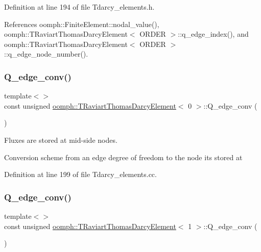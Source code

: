 Definition at line 194 of file Tdarcy\+\_\+elements.\+h.



References oomph\+::\+Finite\+Element\+::nodal\+\_\+value(), oomph\+::\+T\+Raviart\+Thomas\+Darcy\+Element$<$ O\+R\+D\+E\+R $>$\+::q\+\_\+edge\+\_\+index(), and oomph\+::\+T\+Raviart\+Thomas\+Darcy\+Element$<$ O\+R\+D\+E\+R $>$\+::q\+\_\+edge\+\_\+node\+\_\+number().

\mbox{\label{classoomph_1_1TRaviartThomasDarcyElement_a6c9a1ccd1e7121919df4ceb07c092c88}} 
\subsubsection{\texorpdfstring{Q\+\_\+edge\+\_\+conv()}{Q\_edge\_conv()}\hspace{0.1cm}{\footnotesize\ttfamily [1/2]}}
{\footnotesize\ttfamily template$<$$>$ \\
const unsigned \hyperlink{classoomph_1_1TRaviartThomasDarcyElement}{oomph\+::\+T\+Raviart\+Thomas\+Darcy\+Element}$<$ 0 $>$\+::Q\+\_\+edge\+\_\+conv (\begin{DoxyParamCaption}{ }\end{DoxyParamCaption})\hspace{0.3cm}{\ttfamily [private]}}



Fluxes are stored at mid-\/side nodes. 

Conversion scheme from an edge degree of freedom to the node it\textquotesingle{}s stored at 

Definition at line 199 of file Tdarcy\+\_\+elements.\+cc.

\mbox{\label{classoomph_1_1TRaviartThomasDarcyElement_ab72633b1d637a12ff2986ff26ae75bd2}} 
\subsubsection{\texorpdfstring{Q\+\_\+edge\+\_\+conv()}{Q\_edge\_conv()}\hspace{0.1cm}{\footnotesize\ttfamily [2/2]}}
{\footnotesize\ttfamily template$<$$>$ \\
const unsigned \hyperlink{classoomph_1_1TRaviartThomasDarcyElement}{oomph\+::\+T\+Raviart\+Thomas\+Darcy\+Element}$<$ 1 $>$\+::Q\+\_\+edge\+\_\+conv (\begin{DoxyParamCaption}{ }\end{DoxyParamCaption})\hspace{0.3cm}{\ttfamily [private]}}



